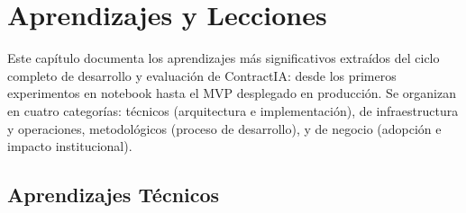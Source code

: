 \chapter{Aprendizajes y Lecciones}

Este capítulo documenta los aprendizajes más significativos extraídos del
ciclo completo de desarrollo y evaluación de ContractIA: desde los primeros
experimentos en notebook hasta el MVP desplegado en producción. Se organizan
en cuatro categorías: técnicos (arquitectura e implementación), de
infraestructura y operaciones, metodológicos (proceso de desarrollo), y de
negocio (adopción e impacto institucional).

\section*{Aprendizajes Técnicos}

